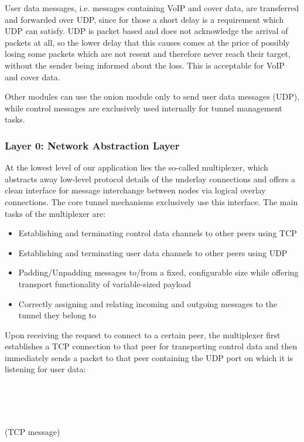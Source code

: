 \documentclass{article}
\begin{document}
User data messages, i.e. messages containing VoIP and cover data, are transferred and forwarded over UDP, since for those a short delay is a requirement which UDP can satisfy. UDP is packet based and does not acknowledge the arrival of packets at all, so the lower delay that this causes comes at the price of possibly losing some packets which are not resent and therefore never reach their target, without the sender being informed about the loss. This is acceptable for VoIP and cover data.

Other modules can use the onion module only to send user data messages (UDP), while control messages are exclusively used internally for tunnel management tasks.

\subsubsection{Layer 0: Network Abstraction Layer}

At the lowest level of our application lies the so-called multiplexer, which abstracts away low-level protocol details of the underlay connections and offers a clean interface for message interchange between nodes via logical overlay connections. The core tunnel mechanisms exclusively use this interface. The main tasks of the multiplexer are:
\begin{itemize}
	\item Establishing and terminating control data channels to other peers using TCP
	\item Establishing and terminating user data channels to other peers using UDP
	\item Padding/Unpadding messages to/from a fixed, configurable size while offering transport functionality of variable-sized payload
	\item Correctly assigning and relating incoming and outgoing messages to the tunnel they belong to
\end{itemize}
Upon receiving the request to connect to a certain peer, the multiplexer first establishes a TCP connection to that peer for transporting control data and then immediately sends a packet to that peer containing the UDP port on which it is listening for user data: \\

	\begin{bytefield}[bitwidth=1.0em]{32}
		 \\
		 \\
	\end{bytefield} \\
(TCP message)
\end{document}
